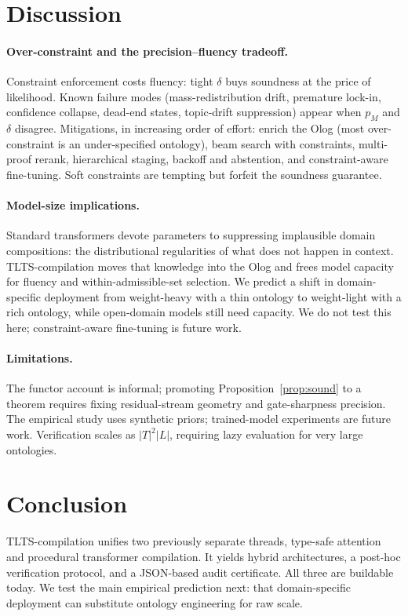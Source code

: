 \documentclass[preprint]{nesy2026}
\begin{document}
\section{Discussion}
\label{sec:disc}

\paragraph{Over-constraint and the precision--fluency tradeoff.}
Constraint enforcement costs fluency: tight $\delta$ buys soundness
at the price of likelihood. Known failure modes
(mass-redistribution drift, premature lock-in, confidence collapse,
dead-end states, topic-drift suppression) appear when $p_M$ and
$\delta$ disagree. Mitigations, in increasing order of effort:
enrich the Olog (most over-constraint is an under-specified
ontology), beam search with constraints, multi-proof rerank,
hierarchical staging, backoff and abstention, and constraint-aware
fine-tuning. Soft constraints are tempting but forfeit the
soundness guarantee.

\paragraph{Model-size implications.} Standard transformers devote
parameters to suppressing implausible domain compositions: the
distributional regularities of what does not happen in context.
TLTS-compilation moves that knowledge into the Olog and frees model
capacity for fluency and within-admissible-set selection. We predict
a shift in domain-specific deployment from weight-heavy with a thin
ontology to weight-light with a rich ontology, while open-domain
models still need capacity. We do not test this here;
constraint-aware fine-tuning is future work.

\paragraph{Limitations.} The functor account is informal; promoting
Proposition~\ref{prop:sound} to a theorem requires fixing
residual-stream geometry and gate-sharpness precision. The
empirical study uses synthetic priors; trained-model experiments
are future work. Verification scales as $|T|^2 |L|$, requiring lazy
evaluation for very large ontologies.

\section{Conclusion}

TLTS-compilation unifies two previously separate threads, type-safe
attention and procedural transformer compilation. It yields hybrid
architectures, a post-hoc verification protocol, and a JSON-based
audit certificate. All three are buildable today. We test the
main empirical prediction next: that domain-specific deployment can
substitute ontology engineering for raw scale.


\end{document}
